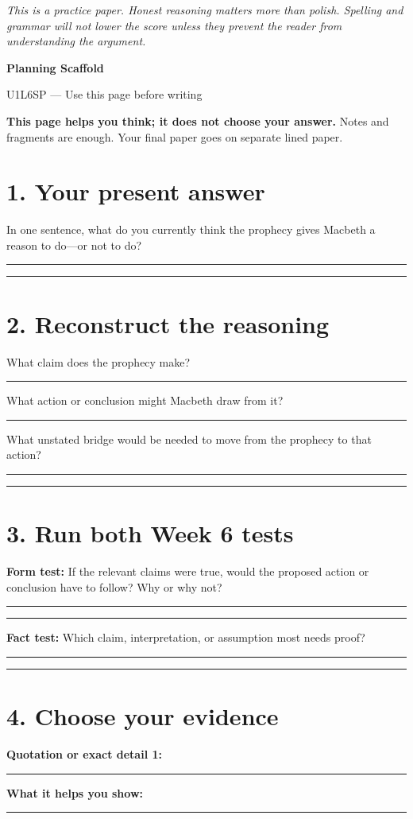 \documentclass[11pt]{article}
\newcommand{\blankline}{\par\vspace{0.1em}\noindent\rule{\linewidth}{0.4pt}\par\vspace{0.35em}}
\begin{document}
\vfill
\textit{This is a practice paper. Honest reasoning matters more than polish. Spelling and grammar will not lower the score unless they prevent the reader from understanding the argument.}
\endgroup

\newpage

\begin{center}
{\Large\bfseries Planning Scaffold}\par
{\large U1L6SP --- Use this page before writing}
\end{center}

\textbf{This page helps you think; it does not choose your answer.} Notes and fragments are enough. Your final paper goes on separate lined paper.

\section*{1. Your present answer}

In one sentence, what do you currently think the prophecy gives Macbeth a reason to do---or not to do?
\blankline
\blankline

\section*{2. Reconstruct the reasoning}

What claim does the prophecy make?
\blankline

What action or conclusion might Macbeth draw from it?
\blankline

What unstated bridge would be needed to move from the prophecy to that action?
\blankline
\blankline

\section*{3. Run both Week 6 tests}

\textbf{Form test:} If the relevant claims were true, would the proposed action or conclusion have to follow? Why or why not?
\blankline
\blankline

\textbf{Fact test:} Which claim, interpretation, or assumption most needs proof?
\blankline
\blankline

\section*{4. Choose your evidence}

\textbf{Quotation or exact detail 1:}
\blankline
\textbf{What it helps you show:}
\blankline
\end{document}
